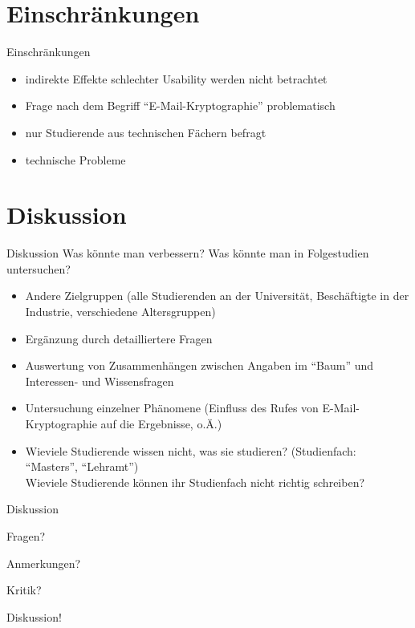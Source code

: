 \documentclass[]{beamer}
\begin{document}
\section{Einschränkungen}
\begin{frame}{Einschränkungen}
	  \begin{itemize}
    \item indirekte Effekte schlechter Usability werden nicht betrachtet
    \item Frage nach dem Begriff ``E-Mail-Kryptographie'' problematisch
    \item nur Studierende aus technischen Fächern befragt
    \item technische Probleme
	\end{itemize}
\end{frame}

\section{Diskussion}
\begin{frame}{Diskussion}
	Was könnte man verbessern? Was könnte man in Folgestudien untersuchen?
	\begin{itemize}[<+->]
		\item Andere Zielgruppen (alle Studierenden an der Universität, Beschäftigte in der Industrie, verschiedene Altersgruppen)
		\item Ergänzung durch detailliertere Fragen
		\item Auswertung von Zusammenhängen zwischen Angaben im ``Baum'' und Interessen- und Wissensfragen
		\item Untersuchung einzelner Phänomene (Einfluss des Rufes von E-Mail-Kryptographie auf die Ergebnisse, o.Ä.)
		\item Wieviele Studierende wissen nicht, was sie studieren? (Studienfach: ``Masters'', ``Lehramt'')\\
			Wieviele Studierende können ihr Studienfach nicht richtig schreiben?
	\end{itemize}
\end{frame}

\begin{frame}{Diskussion}
  \begin{center}
	Fragen?

	Anmerkungen?
    
	Kritik?
    
	Diskussion!
	\end{center}
\end{frame}
\end{document}
